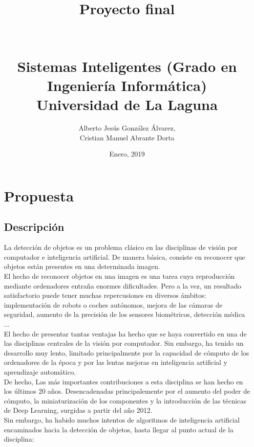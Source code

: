 \documentclass[a4paper]{article}
\title{%
  Proyecto final \\
  \\\\
  \large Sistemas Inteligentes (Grado en Ingeniería Informática) \\
    Universidad de La Laguna}
\author{Alberto Jesús González Álvarez, \\ Cristian Manuel Abrante Dorta}
\date{Enero, 2019}
\begin{document}
\maketitle

\section{Propuesta}
\subsection{Descripción}
La detección de objetos es un problema clásico en las disciplinas de visión por computador e
inteligencia artificial. De manera básica, consiste en reconocer que objetos están presentes en una determinada imagen. \\

El hecho de reconocer objetos en una imagen es una tarea cuya reproducción mediante ordenadores 
entraña enormes dificultades. Pero a la vez, un resultado satisfactorio puede tener muchas 
repercusiones en diversos ámbitos: implementación de robots o coches autónomos, mejora de las cámaras 
de seguridad, aumento de la precisión de los sensores biométricos, detección médica ... \\

El hecho de presentar tantas ventajas ha hecho que se haya convertido en una de las disciplinas 
centrales de la visión por computador. Sin embargo, ha tenido un desarrollo muy lento, limitado 
principalmente por la capacidad de cómputo de los ordenadores de la época y por las lentas mejoras en 
inteligencia artificial y aprendizaje automático.\\

De hecho, Las más importantes contribuciones a esta disciplina se han hecho en los últimos 20 
años. Desencadenadas principalemente por el aumento del poder de cómputo, la miniaturización de los 
componentes y la introducción de las técnicas de Deep Learning, surgidas a partir del año 2012. \\

Sin embargo, ha habido muchos intentos de algoritmos de inteligencia artificial encaminados hacia la detección de objetos, hasta llegar al punto actual de la disciplina:
\end{document}
